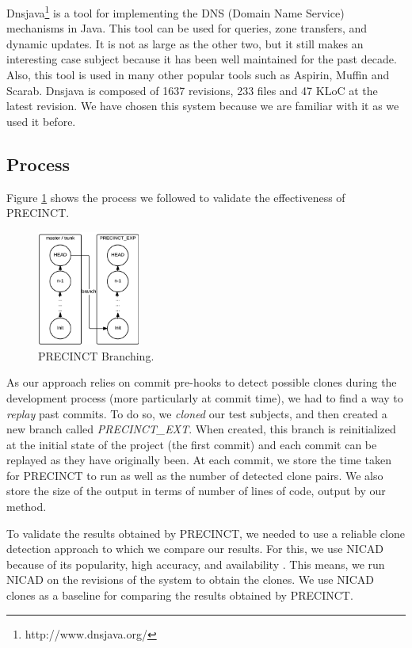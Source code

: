 \documentclass[conference]{IEEEtran}
\begin{document}
Dnsjava\footnote{http://www.dnsjava.org/} is a tool for implementing the DNS (Domain Name Service) mechanisms in Java.
This tool can be used for queries, zone transfers, and dynamic updates.
It is not as large as the other two, but it still makes an interesting case subject because it has been well maintained for the past decade. Also, this tool is used in many other popular tools such as Aspirin, Muffin and
Scarab. Dnsjava is composed of 1637 revisions, 233 files and 47 KLoC at the latest revision.
We have chosen this system because we are familiar with it as we used it before\cite{Nayrolles2015c}.

\subsection{Process}
\label{sub:Process}


Figure \ref{fig:precinct-branching} shows the process we followed to validate the effectiveness of PRECINCT.

\begin{figure}
  \centering
    \includegraphics[width=0.3\textwidth]{media/branch.png}
    \caption{PRECINCT Branching.\label{fig:precinct-branching}}
\end{figure}

As our approach relies on commit pre-hooks to detect possible clones during the development process (more particularly at commit time), we had to find a way to \textit{replay} past commits. To do so, we  \textit{cloned} our test subjects, and then created a new branch called \textit{PRECINCT\_EXT}. 
When created, this branch is reinitialized at the initial state of the project (the first commit) and each commit can be replayed as they have originally been. At each commit, we store the time taken for PRECINCT to run as well as the number of detected clone pairs. We also store the size of the output in terms of number of lines of code, output by our method.

To validate the results obtained by PRECINCT, we needed to use a reliable clone detection approach to which we compare our results. For this, we use NICAD because of its popularity, high accuracy, and availability \cite{Cordy2011}. This means, we run NICAD on the revisions of the system to obtain the clones. We use NICAD clones as a baseline for comparing the results obtained by PRECINCT. 
\end{document}
